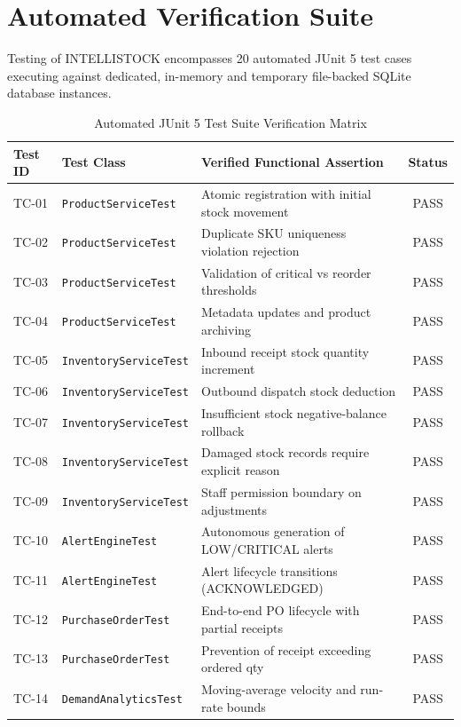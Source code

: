\documentclass[BTech]{srmuthesis}
\begin{document}
\section{Automated Verification Suite}
Testing of INTELLISTOCK encompasses 20 automated JUnit 5 test cases executing against dedicated, in-memory and temporary file-backed SQLite database instances.

\begin{table}[htpb]
\centering
\caption{Automated JUnit 5 Test Suite Verification Matrix}
\begin{tabular}{|l|l|l|c|}
\hline
\textbf{Test ID} & \textbf{Test Class} & \textbf{Verified Functional Assertion} & \textbf{Status} \\ \hline
TC-01 & \texttt{ProductServiceTest} & Atomic registration with initial stock movement & PASS \\ \hline
TC-02 & \texttt{ProductServiceTest} & Duplicate SKU uniqueness violation rejection & PASS \\ \hline
TC-03 & \texttt{ProductServiceTest} & Validation of critical vs reorder thresholds & PASS \\ \hline
TC-04 & \texttt{ProductServiceTest} & Metadata updates and product archiving & PASS \\ \hline
TC-05 & \texttt{InventoryServiceTest} & Inbound receipt stock quantity increment & PASS \\ \hline
TC-06 & \texttt{InventoryServiceTest} & Outbound dispatch stock deduction & PASS \\ \hline
TC-07 & \texttt{InventoryServiceTest} & Insufficient stock negative-balance rollback & PASS \\ \hline
TC-08 & \texttt{InventoryServiceTest} & Damaged stock records require explicit reason & PASS \\ \hline
TC-09 & \texttt{InventoryServiceTest} & Staff permission boundary on adjustments & PASS \\ \hline
TC-10 & \texttt{AlertEngineTest} & Autonomous generation of LOW/CRITICAL alerts & PASS \\ \hline
TC-11 & \texttt{AlertEngineTest} & Alert lifecycle transitions (ACKNOWLEDGED) & PASS \\ \hline
TC-12 & \texttt{PurchaseOrderTest} & End-to-end PO lifecycle with partial receipts & PASS \\ \hline
TC-13 & \texttt{PurchaseOrderTest} & Prevention of receipt exceeding ordered qty & PASS \\ \hline
TC-14 & \texttt{DemandAnalyticsTest} & Moving-average velocity and run-rate bounds & PASS \\ \hline

\end{tabular}
\end{table}
\end{document}
